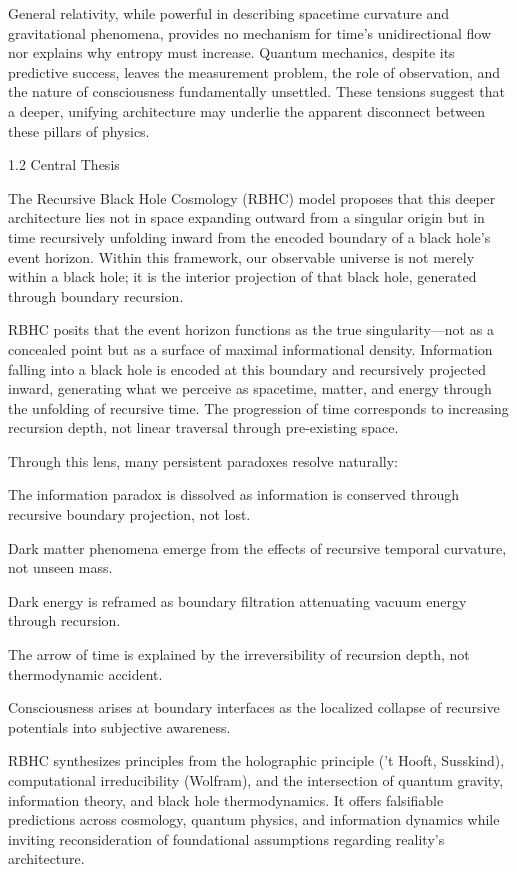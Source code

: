 \documentclass[11pt,a4paper]{article}
\begin{document}
General relativity, while powerful in describing spacetime curvature and gravitational phenomena, provides no mechanism for time’s unidirectional flow nor explains why entropy must increase. Quantum mechanics, despite its predictive success, leaves the measurement problem, the role of observation, and the nature of consciousness fundamentally unsettled. These tensions suggest that a deeper, unifying architecture may underlie the apparent disconnect between these pillars of physics.

1.2 Central Thesis

The Recursive Black Hole Cosmology (RBHC) model proposes that this deeper architecture lies not in space expanding outward from a singular origin but in time recursively unfolding inward from the encoded boundary of a black hole’s event horizon. Within this framework, our observable universe is not merely within a black hole; it is the interior projection of that black hole, generated through boundary recursion.

RBHC posits that the event horizon functions as the true singularity—not as a concealed point but as a surface of maximal informational density. Information falling into a black hole is encoded at this boundary and recursively projected inward, generating what we perceive as spacetime, matter, and energy through the unfolding of recursive time. The progression of time corresponds to increasing recursion depth, not linear traversal through pre-existing space.

Through this lens, many persistent paradoxes resolve naturally:

The information paradox is dissolved as information is conserved through recursive boundary projection, not lost.

Dark matter phenomena emerge from the effects of recursive temporal curvature, not unseen mass.

Dark energy is reframed as boundary filtration attenuating vacuum energy through recursion.

The arrow of time is explained by the irreversibility of recursion depth, not thermodynamic accident.

Consciousness arises at boundary interfaces as the localized collapse of recursive potentials into subjective awareness.


RBHC synthesizes principles from the holographic principle (’t Hooft, Susskind), computational irreducibility (Wolfram), and the intersection of quantum gravity, information theory, and black hole thermodynamics. It offers falsifiable predictions across cosmology, quantum physics, and information dynamics while inviting reconsideration of foundational assumptions regarding reality’s architecture.
\end{document}
